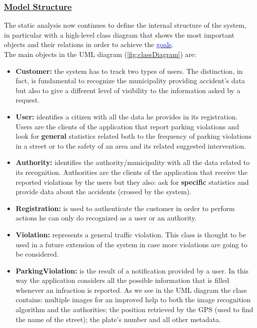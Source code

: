 	\subsubsection[Model Structure]{\hyperlink{toc}{Model Structure}}
	The static analysis now continues to define the internal structure of the system, in particular with a high-level class diagram that shows the most important objects and their relations in order to achieve the \hyperref[sec:goals]{\textcolor{blue}{goals}}.\\
	
	The main objects in the UML diagram (\autoref{fig:classDiagram}) are:
	\begin{itemize}
		\item \textbf{Customer:} the system has to track two types of users. The distinction, in fact, is fundamental to recognize the municipality providing accident's data but also to give a different level of visibility to the information asked by a request.
		
		\item \textbf{User:} identifies a citizen with all the data he provides in its registration. Users are the clients of the application that report parking violations and look for \textbf{general} statistics related both to the frequency of parking violations in a street or to the safety of an area and its related suggested intervention.
		
		\item \textbf{Authority:} identifies the authority/municipality with all the data related to its recognition. Authorities are the clients of the application that receive the reported violations by the users but they also: ask for \textbf{specific} statistics and provide data about the accidents (crossed by the system).
		
		\item \textbf{Registration:} is used to authenticate the customer in order to perform actions he can only do recognized as a user or an authority.
		
		\item \textbf{Violation:} represents a general traffic violation. This class is thought to be used in a future extension of the system in case more violations are going to be considered.
		
		\item \textbf{ParkingViolation:} is the result of a notification provided by a user. In this way the application considers all the possible information that is filled whenever an infraction is reported. As we see in the UML diagram the class contains: multiple images for an  improved help to both the image recognition algorithm and the authorities; the position retrieved by the GPS (used to find the name of the street); the plate's number and all other metadata.
		

\end{itemize}
